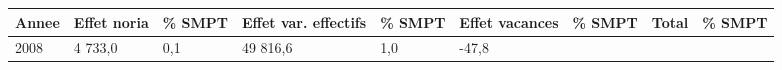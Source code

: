 \begin{longtable}[]{@{}lllllllll@{}}
\toprule
\begin{minipage}[b]{0.05\columnwidth}\raggedright
Annee\strut
\end{minipage} & \begin{minipage}[b]{0.10\columnwidth}\raggedright
Effet noria\strut
\end{minipage} & \begin{minipage}[b]{0.06\columnwidth}\raggedright
\% SMPT\strut
\end{minipage} & \begin{minipage}[b]{0.17\columnwidth}\raggedright
Effet var. effectifs\strut
\end{minipage} & \begin{minipage}[b]{0.06\columnwidth}\raggedright
\% SMPT\strut
\end{minipage} & \begin{minipage}[b]{0.12\columnwidth}\raggedright
Effet vacances\strut
\end{minipage} & \begin{minipage}[b]{0.06\columnwidth}\raggedright
\% SMPT\strut
\end{minipage} & \begin{minipage}[b]{0.08\columnwidth}\raggedright
Total\strut
\end{minipage} & \begin{minipage}[b]{0.06\columnwidth}\raggedright
\% SMPT\strut
\end{minipage}\tabularnewline
\midrule
\endhead
\begin{minipage}[t]{0.05\columnwidth}\raggedright
2008\strut
\end{minipage} & \begin{minipage}[t]{0.10\columnwidth}\raggedright
4 733,0\strut
\end{minipage} & \begin{minipage}[t]{0.06\columnwidth}\raggedright
0,1\strut
\end{minipage} & \begin{minipage}[t]{0.17\columnwidth}\raggedright
49 816,6\strut
\end{minipage} & \begin{minipage}[t]{0.06\columnwidth}\raggedright
1,0\strut
\end{minipage} & \begin{minipage}[t]{0.12\columnwidth}\raggedright
-47,8\strut
\end{minipage} & \begin{minipage}[t]{0.06\columnwidth}\raggedright

\end{minipage}
\end{longtable}

